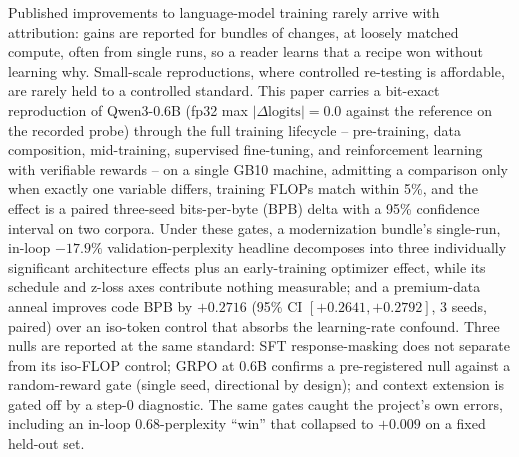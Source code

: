 Published improvements to language-model training rarely arrive with
attribution: gains are reported for bundles of changes, at loosely matched
compute, often from single runs, so a reader learns that a recipe won without
learning why. Small-scale reproductions, where controlled re-testing is
affordable, are rarely held to a controlled standard. This paper carries a
bit-exact reproduction of Qwen3-0.6B (fp32 max
$|\Delta\mathrm{logits}| = 0.0$ against the reference on the recorded probe)
through the full training lifecycle -- pre-training, data composition,
mid-training, supervised fine-tuning, and reinforcement learning with
verifiable rewards -- on a single GB10 machine, admitting a comparison only
when exactly one variable differs, training FLOPs match within 5\%, and the
effect is a paired three-seed bits-per-byte (BPB) delta with a 95\% confidence
interval on two corpora. Under these gates, a modernization bundle's
single-run, in-loop $-17.9\%$ validation-perplexity headline decomposes into
three individually significant architecture effects plus an early-training
optimizer effect, while its schedule and z-loss axes contribute nothing
measurable; and a premium-data anneal improves code BPB by $+0.2716$ (95\% CI
$[+0.2641, +0.2792]$, 3 seeds, paired) over an iso-token control that absorbs
the learning-rate confound. Three nulls are reported at the same standard: SFT
response-masking does not separate from its iso-FLOP control; GRPO at 0.6B
confirms a pre-registered null against a random-reward gate (single seed,
directional by design); and context extension is gated off by a step-0
diagnostic. The same gates caught the project's own errors, including an
in-loop 0.68-perplexity ``win'' that collapsed to $+0.009$ on a fixed held-out
set.
